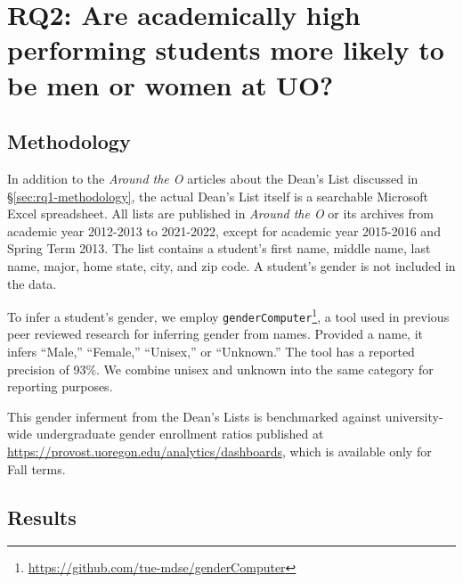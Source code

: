 \documentclass[10pt]{article}
\begin{document}
\section{RQ2: Are academically high performing students more likely to be men or women at UO?}

\subsection{Methodology}

In addition to the \textit{Around the O} articles about the Dean's List discussed in \S\ref{sec:rq1-methodology}, the actual Dean's List itself is a searchable Microsoft Excel spreadsheet. All lists are published in \textit{Around the O} or its archives from academic year 2012-2013 to 2021-2022, except for academic year 2015-2016 and Spring Term 2013. The list contains a student's first name, middle name, last name, major, home state, city, and zip code. A student's gender is not included in the data.

To infer a student's gender, we employ \texttt{genderComputer}\footnote{\url{https://github.com/tue-mdse/genderComputer}}, a tool used in previous peer reviewed research for inferring gender from names. Provided a name, it infers ``Male,'' ``Female,'' ``Unisex,'' or ``Unknown.'' The tool has a reported precision of 93\%. We combine unisex and unknown into the same category for reporting purposes.



This gender inferment from the Dean's Lists is benchmarked against university-wide undergraduate gender enrollment ratios published at \url{https://provost.uoregon.edu/analytics/dashboards}, which is available only for Fall terms.

\subsection{Results}
\end{document}
